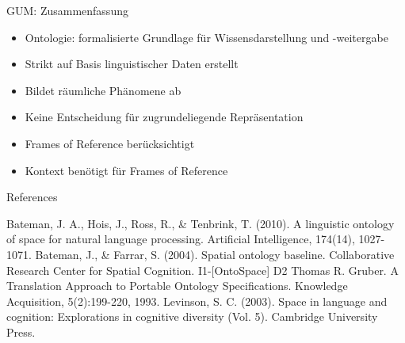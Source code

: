 \documentclass[12pt,a4paper]{beamer}
\begin{document}
\begin{frame}{GUM: Zusammenfassung}
\begin{itemize}
\item Ontologie: formalisierte Grundlage für Wissensdarstellung und -weitergabe
\item Strikt auf Basis linguistischer Daten erstellt
\item Bildet räumliche Phänomene ab
\item Keine Entscheidung für zugrundeliegende Repräsentation
\item Frames of Reference berücksichtigt
\item Kontext benötigt für Frames of Reference
\end{itemize}
\end{frame}







\begin{frame}[allowframebreaks]{References}
\begin{thebibliography}{-}
 Bateman, J. A., Hois, J., Ross, R., \& Tenbrink, T. (2010). A linguistic ontology of space for natural language processing. Artificial Intelligence, 174(14), 1027-1071.
 Bateman, J., \& Farrar, S. (2004). Spatial ontology baseline. Collaborative Research Center for Spatial Cognition. I1-[OntoSpace] D2
 Thomas R. Gruber. A Translation Approach to Portable Ontology Specifications. Knowledge Acquisition, 5(2):199-220, 1993.
 Levinson, S. C. (2003). Space in language and cognition: Explorations in cognitive diversity (Vol. 5). Cambridge University Press.
\end{thebibliography}
\end{frame}
\end{document}
